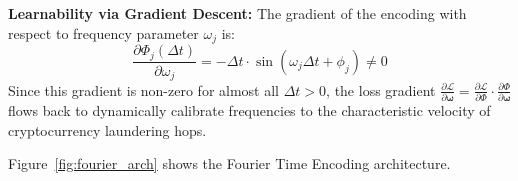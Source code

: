 \vspace{0.5em}
\noindent \textbf{Learnability via Gradient Descent:} The gradient of the encoding with respect to frequency parameter $\omega_j$ is:
\begin{equation}
\frac{\partial \Phi_j(\Delta t)}{\partial \omega_j} = -\Delta t \cdot \sin(\omega_j \Delta t + \phi_j) \neq 0
\label{eq:fourier_gradient}
\end{equation}
Since this gradient is non-zero for almost all $\Delta t > 0$, the loss gradient $\frac{\partial \mathcal{L}}{\partial \boldsymbol{\omega}} = \frac{\partial \mathcal{L}}{\partial \Phi} \cdot \frac{\partial \Phi}{\partial \boldsymbol{\omega}}$ flows back to dynamically calibrate frequencies to the characteristic velocity of cryptocurrency laundering hops.

Figure~\ref{fig:fourier_arch} shows the Fourier Time Encoding architecture.

